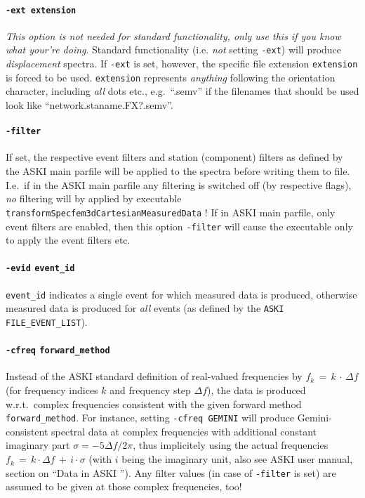\documentclass[12pt,a4paper]{article}
\newcommand{\lcode}[1]{\nolinkurl{#1}}
\newcommand{\ASKI}{ {\ttfamily ASKI} }
\begin{document}
\paragraph{\lcode{-ext extension}}
\emph{This option is not needed for standard functionality, only use this if you know what your're doing}.
Standard functionality (i.e. \emph{not} setting \lcode{-ext}) will produce \emph{displacement} spectra.
If \lcode{-ext} is set, however, the specific file extension \lcode{extension} is forced to be used. 
\lcode{extension} represents \emph{anything} following the orientation character, including 
\emph{all} dots etc., e.g.\ ``.semv'' if the filenames that should be used look like ``network.staname.FX?.semv''.

\paragraph{\lcode{-filter}}
If set, the respective event filters and station (component) filters as defined by the \ASKI{} main parfile will 
be applied to the spectra before writing
them to file. I.e.\, if in the \ASKI{} main parfile any filtering is switched off (by respective flags), 
\emph{no} filtering will by applied by executable \lcode{transformSpecfem3dCartesianMeasuredData} ! If in \ASKI{}
main parfile, only event filters are enabled, then this option \lcode{-filter} will cause the executable only
to apply the event filters etc.

\paragraph{\lcode{-evid} \lcode{event_id}}
\lcode{event_id} indicates a single event for which measured data is produced, otherwise measured data 
is produced for \emph{all} events (as defined by the \lcode{ASKI} \lcode{FILE_EVENT_LIST}).

\paragraph{\lcode{-cfreq} \lcode{forward_method}}
Instead of the \ASKI{} standard definition of real-valued frequencies by $f_k \,=\, k \,\cdot\, \Delta f$
(for frequency indices $k$ and frequency step $\Delta f$), the data is produced w.r.t.\ complex frequencies
consistent with the given forward method \lcode{forward_method}.
For instance, setting \lcode{-cfreq GEMINI} will produce Gemini-consistent spectral data at complex frequencies
with additional constant imaginary part $\sigma = -5\Delta f/2\pi$,
thus implicitely using the actual frequencies $f_k \,=\, k \cdot \Delta f \,+\,i\cdot \sigma$
(with $i$ being the imaginary unit, also see \ASKI{} user manual, section on ``Data in \ASKI{}'').
Any filter values (in case of \lcode{-filter} is set) are assumed to be given at those complex frequencies, too!
\end{document}
